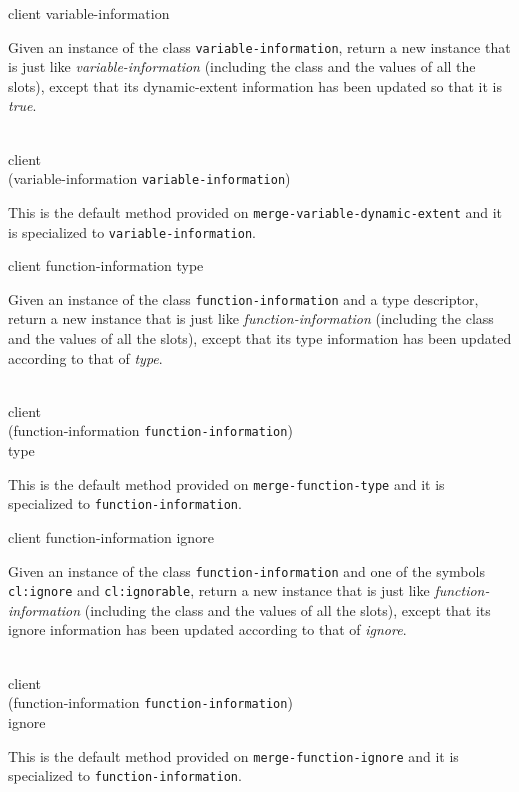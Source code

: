  {client variable-information}

Given an instance of the class \texttt{variable-information}, return a
new instance that is just like \textit{variable-information}
(including the class and the values of all the slots), except that its
dynamic-extent information has been updated so that it is \emph{true}.

\\
           {client\\
            (variable-information {\tt variable-information})}

This is the default method provided on
\texttt{merge-variable-dynamic-extent} and it is specialized to
\texttt{variable-information}.

 {client function-information type}

Given an instance of the class \texttt{function-information} and a
type descriptor, return a new instance that is just like
\textit{function-information} (including the class and the values of
all the slots), except that its type information has been updated
according to that of \textit{type}.

\\
           {client\\
            (function-information {\tt function-information})\\
            type}

This is the default method provided on \texttt{merge-function-type}
and it is specialized to \texttt{function-information}.

 {client function-information ignore}

Given an instance of the class \texttt{function-information} and one
of the symbols \texttt{cl:ignore} and \texttt{cl:ignorable},
return a new instance that is just like
\textit{function-information} (including the class and the values of
all the slots), except that its ignore information has been updated
according to that of \textit{ignore}.

\\
           {client\\
            (function-information {\tt function-information})\\
            ignore}

This is the default method provided on \texttt{merge-function-ignore}
and it is specialized to \texttt{function-information}.

